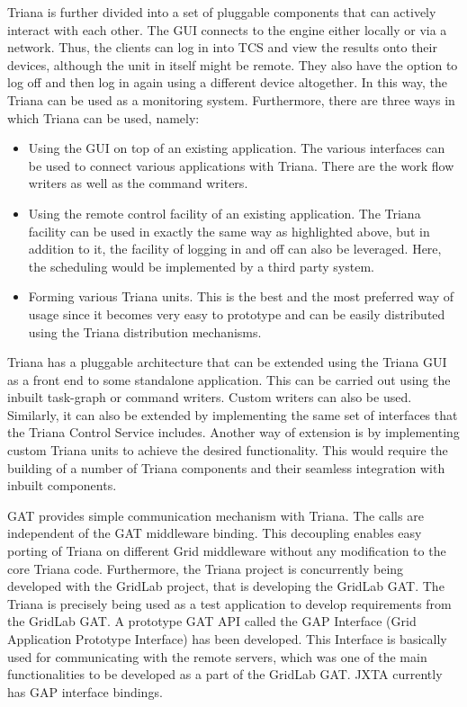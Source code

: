 \documentclass[9pt,twocolumn,twoside]{styles/osajnl}
\begin{document}
Triana is further divided into a set of pluggable components that can 
actively interact with each other. The GUI connects to the engine either 
locally or via a network. Thus, the clients can log in into TCS and view 
the results onto their devices, although the unit in itself might be 
remote. They also have the option to log off and then log in again using 
a different device altogether. In this way, the Triana can be used as a 
monitoring system. Furthermore, there are three ways in which Triana can 
be used, namely: 

\begin{itemize} 

\item Using the GUI on top of an existing application. The various 
interfaces can be used to connect various applications with Triana. 
There are the work flow writers as well as the command writers. 

\item Using the remote control facility of an existing application. The 
Triana facility can be used in exactly the same way as highlighted 
above, but in addition to it, the facility of logging in and off can 
also be leveraged. Here, the scheduling would be implemented by a third 
party system. 

\item Forming various Triana units. This is the best and the most 
preferred way of usage since it becomes very easy to prototype and can 
be easily distributed using the Triana distribution mechanisms. 

\end{itemize} 

Triana has a pluggable architecture that can be extended using the 
Triana GUI as a front end to some standalone application. This can be 
carried out using the inbuilt task-graph or command writers. Custom 
writers can also be used. Similarly, it can also be extended by 
implementing the same set of interfaces that the Triana Control Service 
includes. Another way of extension is by implementing custom Triana 
units to achieve the desired functionality. This would require the 
building of a number of Triana components and their seamless integration 
with inbuilt components.

GAT provides simple communication mechanism with Triana. The calls are 
independent of the GAT middleware binding. This decoupling enables easy 
porting of Triana on different Grid middleware without any modification 
to the core Triana code. Furthermore, the Triana project is concurrently 
being developed with the GridLab project, that is developing the GridLab 
GAT. The Triana is precisely being used as a test application to develop 
requirements from the GridLab GAT. A prototype GAT API called the GAP 
Interface (Grid Application Prototype Interface) has been developed. 
This Interface is basically used for communicating with the remote 
servers, which was one of the main functionalities to be developed as a 
part of the GridLab GAT. JXTA currently has GAP interface bindings. 
\end{document}
